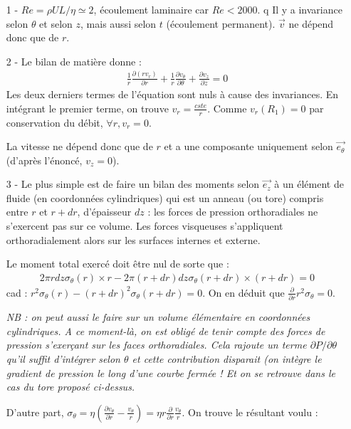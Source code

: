 \documentclass{report}
\begin{document}
\begin{itemize}

\item[1 - ] $Re=\rho UL/\eta\simeq2$, écoulement laminaire car $Re< 2000$. q Il y a invariance selon $\theta$ et selon $z$, mais aussi selon $t$ (écoulement permanent). $\vec{v}$ ne dépend donc que de $r$. 
\item[2 - ] Le bilan de matière donne : 
\begin{align*}
	\frac{1}{r}\frac{\partial(rv_r)}{\partial r} + \frac{1}{r}\frac{\partial v_\theta}{\partial \theta}+\frac{\partial v_z}{\partial z}=0
\end{align*}
Les deux derniers termes de l'équation sont nuls à cause des invariances. En intégrant le premier terme, on trouve $v_r=\frac{cste}{r}$. Comme $v_r(R_1)=0$ par conservation du débit, $\forall r, v_r=0$.

La vitesse ne dépend donc que de $r$ et a une composante uniquement selon $\vec{e_\theta}$ (d'après l'énoncé, $v_z=0$).

\item[3 - ] Le plus simple est de faire un bilan des moments selon $\vec{e_z}$ à un élément de fluide (en coordonnées cylindriques) qui est un anneau (ou tore) compris entre $r$ et $r+dr$, d'épaisseur $dz$ : les forces de pression orthoradiales ne s'exercent pas sur ce volume. Les forces visqueuses s'appliquent orthoradialement alors sur les surfaces internes et externe. 

Le moment total exercé doit être nul de sorte que : 
\begin{align*}
	2\pi r dz \sigma_\theta(r)\times r - 2\pi (r+dr) dz \sigma_\theta(r+dr)\times (r+dr) = 0
\end{align*}
cad : $r^2 \sigma_\theta(r) - (r+dr)^2 \sigma_\theta(r+dr) = 0$. On en déduit que $\frac{\partial}{\partial r}r^2\sigma_\theta=0$.

\textit{NB : on peut aussi le faire sur un volume élémentaire en coordonnées cylindriques. A ce moment-là, on est obligé de tenir compte des forces de pression s'exerçant sur les faces orthoradiales. Cela rajoute un terme $\partial P/\partial\theta$ qu'il suffit d'intégrer selon $\theta$ et cette contribution disparait (on intègre le gradient de pression le long d'une courbe fermée ! Et on se retrouve dans le cas du tore proposé ci-dessus.}

D'autre part, $\sigma_\theta=\eta\left(\frac{\partial v_\theta}{\partial r}-\frac{v_\theta}{r}\right) =\eta r \frac{\partial}{\partial r}\frac{v_\theta}{r} $. On trouve le résultant voulu :


\end{itemize}
\end{document}
